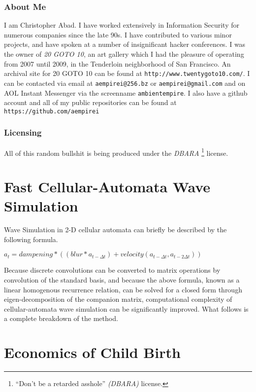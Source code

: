 \documentclass[11pt]{book}
\begin{document}
\subsection{About Me}

I am Christopher Abad. I have worked extensively in Information Security for numerous companies since the late 90s. I have contributed to various minor projects, and have spoken at a number of insignificant hacker conferences. I was the owner of \emph{20 GOTO 10}, an art gallery which I had the pleasure of operating from 2007 until 2009, in the Tenderloin neighborhood of San Francisco. An archival site for 20 GOTO 10 can be found at {\tt http://www.twentygoto10.com/}. I can be contacted via email at {\tt aempirei@256.bz} or {\tt aempirei@gmail.com} and on AOL Instant Messenger via the screenname {\tt ambientempire}. I also have a github account and all of my public repositories can be found at {\tt https://github.com/aempirei}

\subsection{Licensing}
\label{sec:DBARA}

All of this random bullshit is being produced under the \emph{DBARA}%
\footnote{``Don't be a retarded asshole'' \emph{(DBARA)} license.}
license.

\chapter{Fast Cellular-Automata Wave Simulation}

Wave Simulation in 2-D cellular automata can briefly be described by the following formula.

$\displaystyle a_{t} = dampening * ((blur * a_{t-{\Delta}t}) + velocity(a_{t-{\Delta}t},a_{t-2{\Delta}t})) $

Because discrete convolutions can be converted to matrix operations by convolution of the standard basis, and because the above formula, known as a linear homogenous recurrence relation, can be solved for a closed form through eigen-decomposition of the companion matrix, computational complexity of cellular-automata wave simulation can be significantly improved. What follows is a complete breakdown of the method.

\chapter{Economics of Child Birth}
\end{document}
